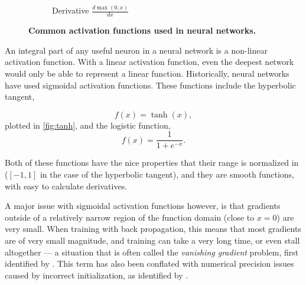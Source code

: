 \documentclass[thesis]{subfiles}
\begin{document}
\begin{figure}[tbp]
\begin{subfigure}[t]{0.48\textwidth}
		\caption{Derivative $\frac{d \max(0,x)}{dx}$}\label{fig:relugradient}
	\end{subfigure}
	\caption[Activation functions.]{\textbf{Common activation functions used in neural networks.}}\label{fig:afunctions}
\end{figure}

An integral part of any useful neuron in a neural network is a non-linear activation function. With a linear activation function, even the deepest network would only be able to represent a linear function. Historically, neural networks have used sigmoidal activation functions. These functions include the hyperbolic tangent,

\begin{equation}
    f(x) = \tanh(x),
\end{equation}
plotted in \cref{fig:tanh}, and the logistic function,
\begin{equation}
f(x) = \frac{1}{1+e^{-x}}.
\end{equation}

Both of these functions have the nice properties that their range is normalized in ($[-1,1]$ in the case of the hyperbolic tangent), and they are smooth functions, with easy to calculate derivatives.

A major issue with sigmoidal activation functions however, is that gradients outside of a relatively narrow region of the function domain (close to $x=0$) are very small. When training with back propagation, this means that most gradients are of very small magnitude, and training can take a very long time, or even stall altogether --- a situation that is often called the \emph{vanishing gradient} problem, first identified by \citet{hochreiter1991untersuchungen}. This term has also been conflated with numerical precision issues caused by incorrect initialization, as identified by \citet{glorot2010understanding}.
\end{document}

